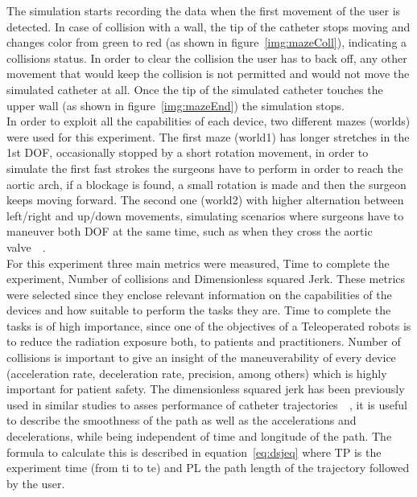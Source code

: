 The simulation starts recording the data when the first movement of the user is detected. In case of collision with a wall, the tip of the catheter stops moving and changes color from green to red (as shown in figure~\ref{img:mazeColl}), indicating a collisions status. In order to clear the collision the user has to back off, any other movement that would keep the collision is not permitted and would not move the simulated catheter at all. Once the tip of the simulated catheter touches the upper wall (as shown in figure~\ref{img:mazeEnd}) the simulation stops.\\

In order to exploit all the capabilities of each device, two different mazes (worlds) were used for this experiment. The first maze (world1) has longer stretches in the 1st DOF, occasionally stopped by a short rotation movement, in order to simulate the first fast strokes the surgeons have to perform in order to reach the aortic arch, if a blockage is found, a small rotation is made and then the surgeon keeps moving forward. The second one (world2) with higher alternation between left/right and up/down movements, simulating scenarios where surgeons have to maneuver both DOF at the same time, such as when they cross the aortic valve~\cite{raptech}~\cite{anatomic}.\\

For this experiment three main metrics were measured, Time to complete the experiment, Number of collisions and Dimensionless squared Jerk. These metrics were selected since they enclose relevant information on the capabilities of the devices and how suitable to perform the tasks they are. Time to complete the tasks is of high importance, since one of the objectives of a Teleoperated robots is to reduce the radiation exposure both, to patients and practitioners. Number of collisions is important to give an insight of the maneuverability of every device (acceleration rate, deceleration rate, precision, among others) which is highly important for patient safety. The dimensionless squared jerk has been previously used in similar studies to asses performance of catheter trajectories~\cite{dsj}~\cite{dsj2}, it is useful to describe the smoothness of the path as well as the accelerations and decelerations, while being independent of time and longitude of the path. The formula to calculate this is described in equation~\ref{eq:dsjeq} where TP is the experiment time (from ti to te) and PL the path length of the trajectory followed by the user.\\


